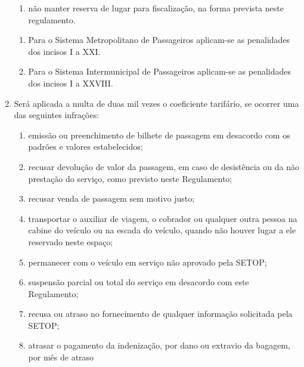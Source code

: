\begin{enumerate}[resume, label=Art. \arabic*]
\begin{enumerate}[label=\roman*.]
\item não manter reserva de lugar para fiscalização, na forma prevista neste regulamento.

\end{enumerate}

\begin{enumerate}[label= \S \arabic*] %

\item Para o Sistema Metropolitano de Passageiros aplicam-se as penalidades dos incisos I a XXI.

\item Para o Sistema Intermunicipal de Passageiros aplicam-se as penalidades dos incisos I a XXVIII.

\end{enumerate}

\item Será aplicada a multa de duas mil vezes o coeficiente tarifário, se ocorrer uma das seguintes infrações:

\begin{enumerate}[label=\roman*.]

\item emissão ou preenchimento de bilhete de passagem em desacordo com os padrões e valores estabelecidos;

\item recusar devolução de valor da passagem, em caso de desistência ou da não prestação do serviço, como previsto neste Regulamento;

\item recusar venda de passagem sem motivo justo;

\item transportar o auxiliar de viagem, o cobrador ou qualquer outra pessoa na cabine do veículo ou na escada do veículo, quando não houver lugar a ele reservado neste espaço;

\item permanecer com o veículo em serviço não aprovado pela SETOP;

\item suspensão parcial ou total do serviço em desacordo com este Regulamento;

\item recusa ou atraso no fornecimento de qualquer informação solicitada pela SETOP;

\item atrasar o pagamento da indenização, por dano ou extravio da bagagem, por mês de atraso


\end{enumerate}
\end{enumerate}
